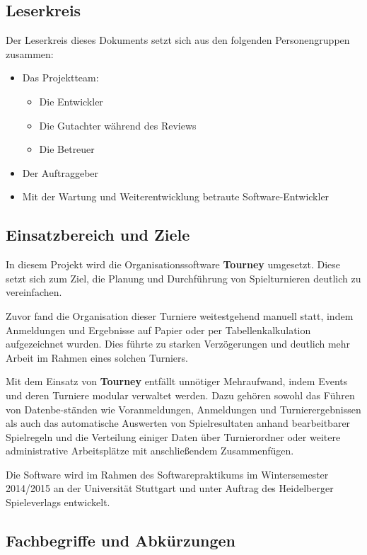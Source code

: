 \documentclass[11pt]{article}
\begin{document}
\subsection{Leserkreis}

Der Leserkreis dieses Dokuments setzt sich aus den folgenden Personengruppen zusammen:
\begin{itemize}
	\item Das Projektteam:
	\begin{itemize}
		\item Die Entwickler
		\item Die Gutachter während des Reviews
		\item Die Betreuer
	\end{itemize}
	\item Der Auftraggeber
	\item Mit der Wartung und Weiterentwicklung betraute Software-Entwickler
\end{itemize}

\subsection{Einsatzbereich und Ziele}

In diesem Projekt wird die Organisationssoftware \textbf{Tourney} umgesetzt. Diese setzt sich zum Ziel, die Planung und Durchführung von Spielturnieren deutlich zu vereinfachen.

Zuvor fand die Organisation dieser Turniere weitestgehend manuell statt, indem Anmeldungen und Ergebnisse auf Papier oder per Tabellenkalkulation aufgezeichnet wurden. Dies führte zu starken Verzögerungen und deutlich mehr Arbeit im Rahmen eines solchen Turniers.

Mit dem Einsatz von \textbf{Tourney} entfällt unnötiger Mehraufwand, indem Events und deren Turniere modular verwaltet werden. Dazu gehören sowohl das Führen von Datenbe-ständen wie Voranmeldungen, Anmeldungen und Turnierergebnissen als auch das automatische Auswerten von Spielresultaten anhand bearbeitbarer Spielregeln und die Verteilung einiger Daten über Turnierordner oder weitere administrative Arbeitsplätze mit anschließendem Zusammenfügen.

Die Software wird im Rahmen des Softwarepraktikums im Wintersemester 2014/2015 an der Universität Stuttgart und unter Auftrag des Heidelberger Spieleverlags entwickelt.

\subsection{Fachbegriffe und Abkürzungen}
\end{document}
